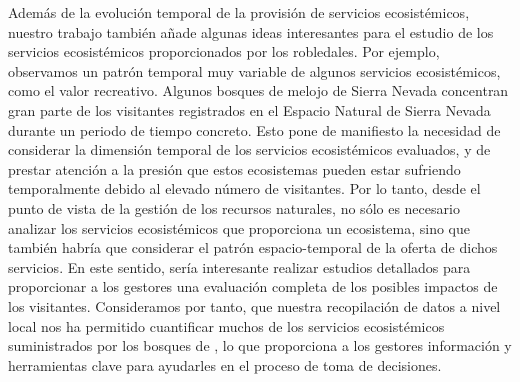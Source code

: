 Además de la evolución temporal de la provisión de servicios ecosistémicos, nuestro trabajo también añade algunas ideas interesantes para el estudio de los servicios ecosistémicos proporcionados por los robledales. Por ejemplo, observamos un patrón temporal muy variable de algunos servicios ecosistémicos, como el valor recreativo. Algunos bosques de melojo de Sierra Nevada concentran gran parte de los visitantes registrados en el Espacio Natural de Sierra Nevada durante un periodo de tiempo concreto. Esto pone de manifiesto la necesidad de considerar la dimensión temporal de los servicios ecosistémicos evaluados, y de prestar atención a la presión que estos ecosistemas pueden estar sufriendo temporalmente debido al elevado número de visitantes. Por lo tanto, desde el punto de vista de la gestión de los recursos naturales, no sólo es necesario analizar los servicios ecosistémicos que proporciona un ecosistema, sino que también habría que considerar el patrón espacio-temporal de la oferta de dichos servicios. En este sentido, sería interesante realizar estudios detallados para proporcionar a los gestores una evaluación completa de los posibles impactos de los visitantes. Consideramos por tanto, que nuestra recopilación de datos a nivel local nos ha permitido cuantificar muchos de los servicios ecosistémicos suministrados por los bosques de \Qp, lo que proporciona a los gestores información y herramientas clave para ayudarles en el proceso de toma de decisiones.
